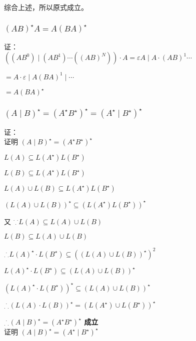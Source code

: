 \documentclass[12pt, a4paper]{article}
\begin{document}
    {综合上述，所以原式成立。}

    \subsubsection{$(AB)^{\star}A = A(BA)^{\star}$}
  
    {证：}\\

    {$((AB^{0})\mid(AB^{1})\cdots((AB)^{N}))\cdot A = \varepsilon A \mid A \cdot (AB)^{1}\cdots$}

    {$= A \cdot \varepsilon \mid A(BA)^{1} \mid \cdots$}

    {$= A(BA)^{\star}$}
    \subsubsection{$(A \mid B)^{\star} = (A^{\star}B^{\star})^{\star} = (A^{\star} \mid B^{\star})^{\star}$}

    {证：}\\

    {证明 $(A \mid B)^{\star} = (A^{\star}B^{\star})^{\star}$}

    {$L(A) \subseteq L(A^{\star})L(B^{\star})$}

    {$L(B) \subseteq L(A^{\star})L(B^{\star})$}

    {$L(A) \cup L(B) \subseteq L(A^{\star})L(B^{\star})$}

    {$(L(A) \cup L(B))^{\star} \subseteq (L(A^{\star})L(B^{\star}))^{\star}$}

    {又 ${}^\cdot{}_\cdot{}^\cdot L(A) \subseteq L(A) \cup L(B)$}

    {\qquad$L(B) \subseteq L(A) \cup L(B)$}

    {${}_\cdot{}^\cdot{}_\cdot L(A)^{\star}\cdot L(B^{\star}) \subseteq ((L(A) \cup L(B))^{\star})^{2}$}

    {\quad$L(A)^{\star}\cdot L(B^{\star}) \subseteq (L(A) \cup L(B))^{\star}$}

    {\quad$(L(A)^{\star}\cdot L(B^{\star}))^{\star} \subseteq (L(A) \cup L(B))^{\star}$}

    {${}_\cdot{}^\cdot{}_\cdot (L(A) \cdot L(B))^{\star} = (L(A^{\star}) \cup L(B^{\star}))^{\star}$}

    \textbf{${}_\cdot{}^\cdot{}_\cdot (A \mid B)^{\star} = (A^{\star}B^{\star})^{\star}$ 成立}\\

    {证明 $(A \mid B)^{\star} = (A^{\star} \mid B^{\star})^{\star}$}
\end{document}
